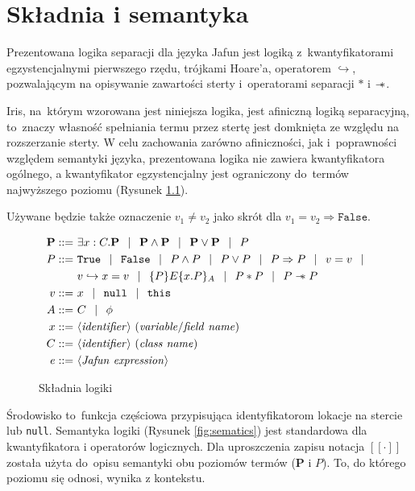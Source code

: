 \documentclass[]{pracamgr}
\newcommand \wand {\mathrel{-\mkern-6mu*}}
\newcommand \outerP {\mathbf{P}}
\newcommand \hoare [5] {\{#1\}#2\{#4.#5\}_#3}
\renewcommand \| {\hspace{0.75em} | \hspace{0.75em} }
\renewcommand \[ {[\![}
\renewcommand \] {]\!]}
\theoremstyle{definition}
\begin{document}
\chapter{Składnia i semantyka}
Prezentowana logika separacji dla języka Jafun jest logiką z~kwantyfikatorami egzystencjalnymi pierwszego rzędu, trójkami Hoare'a, operatorem $\hookrightarrow$,
pozwalającym na opisywanie zawartości sterty i~operatorami separacji $*$ i $\wand$.

Iris, na~którym wzorowana jest niniejsza logika, jest afiniczną logiką separacyjną, to~znaczy
własność spełniania termu przez stertę jest domknięta ze względu na rozszerzanie sterty.
W celu zachowania zarówno afiniczności, jak i~poprawności względem semantyki
języka, prezentowana logika nie zawiera kwantyfikatora ogólnego,
a kwantyfikator egzystencjalny jest ograniczony
do~termów najwyższego poziomu (Rysunek \ref{fig:syntax}).

Używane będzie także oznaczenie $v_1 \neq v_2$ jako skrót dla $v_1 = v_2 \Rightarrow \mathtt{False}$.

\begin{figure}[h]
\begin{align*}
 \outerP ::= & \ \exists x : C.\outerP \| \outerP \wedge \outerP \| \outerP \vee \outerP \| P \\
 P ::= & \ \mathtt{True} \| \mathtt{False} \| P \wedge P \| P \vee P \| P \Rightarrow P \| v = v \| \\
     & \  v \hookrightarrow x = v \| \hoare{P}{E}{A}{x}{P} \|  P * P \| P \wand P \\
 v ::= & \  x \| \mathtt{null} \| \mathtt{this} \\
 A ::= & \ C \| \phi \\
 x ::= & \ \langle\mathit{identifier}\rangle \ (\mathit{variable / field\ name}) \\
 C ::= & \ \langle\mathit{identifier}\rangle \ (\mathit{class\ name}) \\
 e ::= & \ \langle \mathit{Jafun\ expression} \rangle
\end{align*}
\caption{Składnia logiki}
\label{fig:syntax}
\end{figure}

Środowisko to~funkcja częściowa przypisująca identyfikatorom lokacje na stercie lub \texttt{null}.
Semantyka logiki (Rysunek \ref{fig:sematics}) jest standardowa dla kwantyfikatora i operatorów logicznych.
Dla uproszczenia zapisu notacja $\[ \cdot \]$ została użyta do~opisu semantyki obu poziomów termów
($\outerP$ i $P$). To, do którego poziomu się odnosi, wynika z kontekstu.
\end{document}
